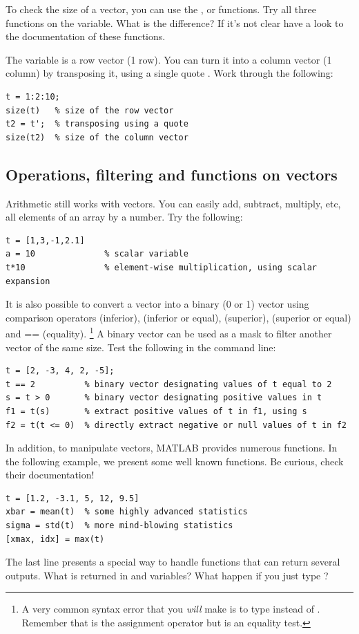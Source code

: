 \documentclass{article}
\begin{document}
To check the size of a vector, you can use the ,  or  functions.
Try all three functions on the  variable. What is the difference?
If it's not clear have a look to the documentation of these functions.

The variable  is a row vector (1 row).
You can turn it into a column vector (1 column) by transposing it, using a single quote .
Work through the following:
\begin{lstlisting}
t = 1:2:10;
size(t)   % size of the row vector
t2 = t';  % transposing using a quote
size(t2)  % size of the column vector
\end{lstlisting}

\subsection{Operations, filtering and functions on vectors}

Arithmetic still works with vectors.
You can easily add, subtract, multiply, etc, all elements of an array by a number.
Try the following:
\begin{lstlisting}
t = [1,3,-1,2.1]
a = 10              % scalar variable
t*10                % element-wise multiplication, using scalar expansion
\end{lstlisting}

It is also possible to convert a vector into a binary (0 or 1) vector using 
comparison operators \mcode{<} (inferior), \mcode{<=} (inferior or equal), \mcode{>} (superior), \mcode{>=} (superior or equal) and {==} (equality).%
\footnote{%
  A very common syntax error that you \emph{will} make is to type  instead of .
  Remember that \mcode{=} is the assignment operator but \mcode{==} is an equality test.
}
A binary vector can be used as a mask to filter another vector of the same size.
Test the following in the command line:
\begin{lstlisting}
t = [2, -3, 4, 2, -5];
t == 2          % binary vector designating values of t equal to 2
s = t > 0       % binary vector designating positive values in t
f1 = t(s)       % extract positive values of t in f1, using s
f2 = t(t <= 0)  % directly extract negative or null values of t in f2
\end{lstlisting}

In addition, to manipulate vectors, MATLAB provides numerous functions.
In the following example, we present some well known functions.
Be curious, check their documentation!
\begin{lstlisting}
t = [1.2, -3.1, 5, 12, 9.5]
xbar = mean(t)  % some highly advanced statistics
sigma = std(t)  % more mind-blowing statistics
[xmax, idx] = max(t)
\end{lstlisting}
The last line presents a special way to handle functions that can return several outputs.
What is returned in  and  variables?
What happen if you just type ?
\end{document}
